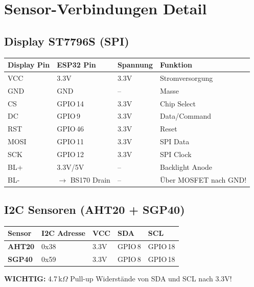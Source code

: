 \documentclass[a4paper,11pt]{article}
\begin{document}
\section{Sensor-Verbindungen Detail}

\subsection{Display ST7796S (SPI)}

\begin{longtable}{p{2.8cm} p{2.8cm} p{2.5cm} p{4.5cm}}
\toprule
\rowcolor{tableheader}
\textbf{Display Pin} & \textbf{ESP32 Pin} & \textbf{Spannung} & \textbf{Funktion} \\
\midrule
\endhead
VCC   & 3.3V     & 3.3V & Stromversorgung \\
GND   & GND      & --   & Masse \\
CS    & GPIO\,14 & 3.3V & Chip Select \\
DC    & GPIO\,9  & 3.3V & Data/Command \\
RST   & GPIO\,46 & 3.3V & Reset \\
MOSI  & GPIO\,11 & 3.3V & SPI Data \\
SCK   & GPIO\,12 & 3.3V & SPI Clock \\
BL+   & 3.3V/5V  & --   & Backlight Anode \\
BL-   & $\rightarrow$ BS170 Drain & -- & Über MOSFET nach GND! \\
\bottomrule
\end{longtable}

\subsection{I2C Sensoren (AHT20 + SGP40)}

\begin{longtable}{p{2.5cm} p{2.5cm} p{2cm} p{2.5cm} p{2.5cm}}
\toprule
\rowcolor{tableheader}
\textbf{Sensor} & \textbf{I2C Adresse} & \textbf{VCC} & \textbf{SDA} & \textbf{SCL} \\
\midrule
\endhead
\textbf{AHT20} & 0x38 & 3.3V & GPIO\,8 & GPIO\,18 \\
\textbf{SGP40} & 0x59 & 3.3V & GPIO\,8 & GPIO\,18 \\
\bottomrule
\end{longtable}

\textbf{WICHTIG:} 4.7\,k$\Omega$ Pull-up Widerstände von SDA und SCL nach 3.3V!
\end{document}
